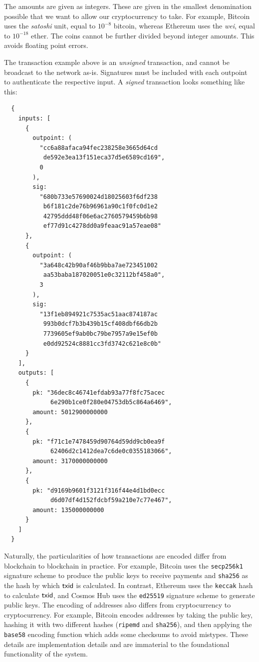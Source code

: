 The amounts are given as integers. These are given in
the smallest denomination possible that we want to allow our cryptocurrency to take.
For example, Bitcoin uses the \emph{satoshi} unit, equal to
$10^{-8}$ bitcoin, whereas Ethereum uses the \emph{wei}, equal to
$10^{-18}$ ether. The coins cannot be further divided beyond integer amounts.
This avoids floating point errors.

The transaction example above is an \emph{unsigned} transaction, and cannot be
broadcast to the network as-is. Signatures must be included with each outpoint
to authenticate the respective input. A \emph{signed} transaction looks something
like this:

\begin{Verbatim}
  {
    inputs: [
      {
        outpoint: (
          "cc6a88afaca94fec238258e3665d64cd
           de592e3ea13f151eca37d5e6589cd169",
          0
        ),
        sig:
          "680b733e57690024d18025603f6df238
           b6f181c2de76b96961a90c1f0fc0d1e2
           42795ddd48f06e6ac2760579459b6b98
           ef77d91c4278dd0a9feaac91a57eae08"
      },
      {
        outpoint: (
          "3a648c42b90af46b9bba7ae723451002
           aa53baba187020051e0c32112bf458a0",
          3
        ),
        sig:
          "13f1eb894921c7535ac51aac874187ac
           993b0dcf7b3b439b15cf408dbf66db2b
           7739605ef9ab0bc79be7957a9e15ef0b
           e0dd92524c8881cc3fd3742c621e8c0b"
      }
    ],
    outputs: [
      {
        pk: "36dec8c46741efdab93a77f8fc75acec
             6e290b1ce0f280e04753db5c864a6469",
        amount: 5012900000000
      },
      {
        pk: "f71c1e7478459d90764d59dd9cb0ea9f
             62406d2c1412dea7c6de0c0355183066",
        amount: 3170000000000
      },
      {
        pk: "d9169b9601f3121f316f44e4d1bd0ecc
             d6d07df4d152fdcbf59a210e7c77e467",
        amount: 135000000000
      }
    ]
  }
\end{Verbatim}

Naturally, the particularities of how transactions are encoded differ from blockchain
to blockchain in practice. For example, Bitcoin uses the \texttt{secp256k1} signature
scheme to produce the public keys to receive payments and
\texttt{sha256} as the hash by which $\mathsf{txid}$ is calculated.
In contrast, Ethereum uses the \texttt{keccak} hash to calculate $\mathsf{txid}$,
and Cosmos Hub uses the \texttt{ed25519} signature scheme to generate public keys.
The encoding of addresses also differs from cryptocurrency to cryptocurrency.
For example, Bitcoin encodes addresses by taking the public key,
hashing it with two different hashes (\texttt{ripemd} and \texttt{sha256}),
and then applying the \texttt{base58}
encoding function which adds some checksums to avoid mistypes.
These details are implementation details and are immaterial to the foundational
functionality of the system.

